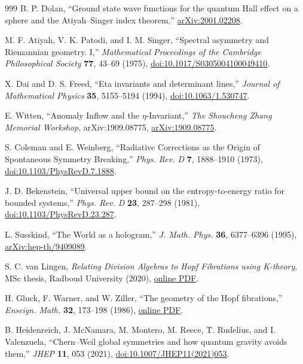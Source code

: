 \documentclass[aps,prd,reprint,nofootinbib,superscriptaddress,floatfix]{revtex4-2}
\numberwithin{equation}{section}
\theoremstyle{definition}
\theoremstyle{plain}
\begin{document}
\begin{thebibliography}{999}
B. P. Dolan,
``Ground state wave functions for the quantum Hall effect on a sphere and
the Atiyah--Singer index theorem,''
\href{https://arxiv.org/abs/2001.02208}{arXiv:2001.02208}.

M. F. Atiyah, V. K. Patodi, and I. M. Singer,
``Spectral asymmetry and Riemannian geometry. I,''
\emph{Mathematical Proceedings of the Cambridge Philosophical Society}
\textbf{77}, 43--69 (1975),
\href{https://doi.org/10.1017/S0305004100049410}{doi:10.1017/S0305004100049410}.

X. Dai and D. S. Freed,
``Eta invariants and determinant lines,''
\emph{Journal of Mathematical Physics} \textbf{35}, 5155--5194 (1994),
\href{https://doi.org/10.1063/1.530747}{doi:10.1063/1.530747}.

E. Witten,
``Anomaly Inflow and the \(\eta\)-Invariant,''
\emph{The Shoucheng Zhang Memorial Workshop}, arXiv:1909.08775,
\href{https://arxiv.org/abs/1909.08775}{arXiv:1909.08775}.



S. Coleman and E. Weinberg,
``Radiative Corrections as the Origin of Spontaneous Symmetry Breaking,''
\emph{Phys. Rev. D} \textbf{7}, 1888--1910 (1973),
\href{https://doi.org/10.1103/PhysRevD.7.1888}{doi:10.1103/PhysRevD.7.1888}.


J. D. Bekenstein,
``Universal upper bound on the entropy-to-energy ratio for bounded systems,''
\emph{Phys. Rev. D} \textbf{23}, 287--298 (1981),
\href{https://doi.org/10.1103/PhysRevD.23.287}{doi:10.1103/PhysRevD.23.287}.

L. Susskind,
``The World as a hologram,''
\emph{J. Math. Phys.} \textbf{36}, 6377--6396 (1995),
\href{https://arxiv.org/abs/hep-th/9409089}{arXiv:hep-th/9409089}.

S. C. van Lingen,
\emph{Relating Division Algebras to Hopf Fibrations using K-theory},
MSc thesis, Radboud University (2020),
\href{https://www.waltervansuijlekom.nl/wp-content/uploads/2020/08/thesisSuzanvLingen.pdf}{online PDF}.

H. Gluck, F. Warner, and W. Ziller,
``The geometry of the Hopf fibrations,''
\emph{Enseign. Math.} \textbf{32}, 173--198 (1986),
\href{https://ncatlab.org/nlab/files/GluckWarnerZiller-HopfFibrations.pdf}{online PDF}.

B. Heidenreich, J. McNamara, M. Montero, M. Reece, T. Rudelius, and I. Valenzuela,
``Chern--Weil global symmetries and how quantum gravity avoids them,''
\emph{JHEP} \textbf{11}, 053 (2021),
\href{https://doi.org/10.1007/JHEP11(2021)053}{doi:10.1007/JHEP11(2021)053}.


\end{thebibliography}
\end{document}
